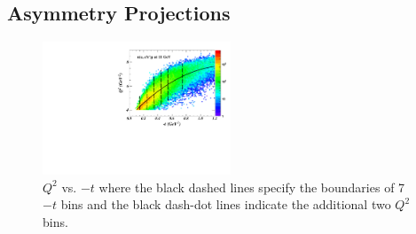 \subsection{Asymmetry Projections}
\begin{figure}[!ht]
 \begin{center}
      \includegraphics[type=pdf,
        ext=.pdf,read=.pdf,width=0.5\textwidth]{./figures/E11_Q2_t_bin_02Hz} 
    \caption[$Q^{2}$ vs. $-t$]{\footnotesize{$Q^{2}$ vs. $-t$ where the black
dashed lines specify the boundaries of 7 $-t$ bins and the black dash-dot lines
indicate the additional two $Q^{2}$ bins. }}
  \label{Q2_t_bin}
  \end{center}
\end{figure}

